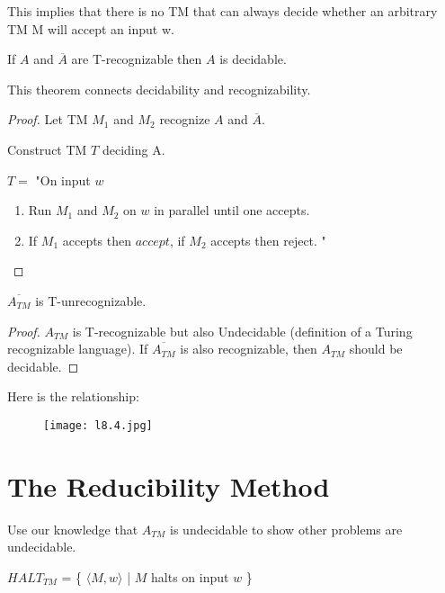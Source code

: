 This implies that there is no TM that can always decide whether an arbitrary TM M  will accept an input w. 

\begin{theorem}
    If \(A\)  and \(\overline{A}\) are T-recognizable then \(A\) is decidable. 
\end{theorem}

This theorem connects decidability and recognizability.

\begin{proof}
    Let TM \(M_1\) and \(M_2\) recognize \(A\) and \(\overline{A}\).     

    Construct TM \(T\) deciding A. 

    \(T = \) "On input \(w\)
    \begin{enumerate}
        \item Run \(M_1\) and \(M_2\) on \(w\) in parallel until one accepts.
        \item If \(M_1\) accepts then \(accept\), if \(M_2\) accepts then reject. "
    \end{enumerate}  
\end{proof}

\begin{corollary}
    \(\overline{A_{TM}}\) is T-unrecognizable. 
\end{corollary}
\begin{proof}
    \(A_{TM}\) is T-recognizable but also Undecidable (definition of a Turing recognizable language). 
    If \(\overline{A_{TM}}\) is also recognizable, then \(A_{TM}\) should be decidable.  
\end{proof}

Here is the relationship:
    \begin{figure}[H]
    \centering
    \texttt{[image: l8.4.jpg]}
    \caption{}
    \end{figure}

\section{The Reducibility Method}

Use our knowledge that \(A_{TM}\) is undecidable to show other problems are undecidable. 

\begin{definition}
    \(HALT_{TM}\) = \{ \( \langle M, w \rangle\) | \(M\) halts on input \(w\) \}  
\end{definition}

